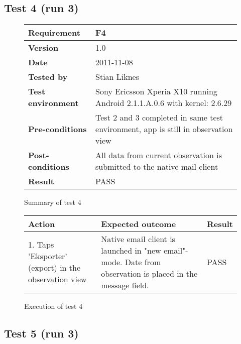 \newpage
\subsection{Test 4 (run 3)}

	\begin{figure}[htb]
		\centering
		\begin{tabular}{|p{3.5cm}|p{7.0cm}|} \hline
			\textbf{Requirement} & F4 \\ \hline
			\textbf{Version} & 1.0 \\ \hline
			\textbf{Date} & 2011-11-08 \\ \hline
			\textbf{Tested by} & Stian Liknes \\ \hline
			\textbf{Test environment} & Sony Ericsson Xperia X10 running Android 2.1.1.A.0.6 with kernel: 2.6.29 \\ \hline
			\textbf{Pre-conditions} & Test 2 and 3 completed in same test environment, app is still in observation view \\ \hline
			\textbf{Post-conditions} & All data from current observation is submitted to the native mail client \\ \hline
			\textbf{Result} & PASS \\ \hline
		\end{tabular}
		\caption{Summary of test 4}
	\end{figure}

	\begin{figure}[htb]
		\centering
		\begin{tabular}{|p{5.0cm}|p{5.0cm}|p{1cm}|}
			\hline \textbf{Action} & \textbf{Expected outcome} & \textbf{Result} \\ \hline
			1. Taps 'Eksporter' (export) in the observation view &
			Native email client is launched in "new email"-mode. Date from
			observation is placed in the message field. &
			PASS \\ \hline
		\end{tabular}
		\caption{Execution of test 4}
	\end{figure}

\newpage
\subsection{Test 5 (run 3)}

